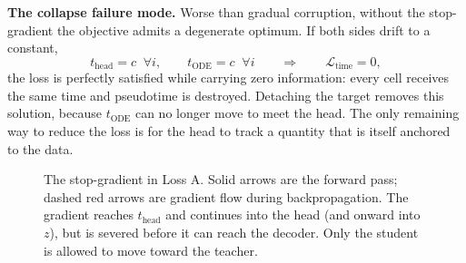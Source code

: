 \documentclass[11pt,a4paper]{article}
\newenvironment{keybox}{\begin{shaded}\noindent}{\end{shaded}}
\newcommand{\ts}{t_{s}}
\theoremstyle{definition}
\begin{document}
\begin{keybox}
\textbf{The collapse failure mode.} Worse than gradual corruption, without the
stop-gradient the objective admits a degenerate optimum. If both sides drift to
a constant,
\[
t_{\text{head}} = c \;\;\forall i, \qquad t_{\text{ODE}} = c \;\;\forall i
\qquad\Longrightarrow\qquad \mathcal{L}_{\text{time}} = 0 ,
\]
the loss is perfectly satisfied while carrying zero information: every cell
receives the same time and pseudotime is destroyed. Detaching the target
removes this solution, because $t_{\text{ODE}}$ can no longer move to meet the
head. The only remaining way to reduce the loss is for the head to track a
quantity that is itself anchored to the data.
\end{keybox}

\begin{figure}[htbp]
\centering
{}
\caption{The stop-gradient in Loss A. Solid arrows are the forward pass; dashed
red arrows are gradient flow during backpropagation. The gradient reaches
$t_{\text{head}}$ and continues into the head (and onward into $z$), but is
severed before it can reach the decoder. Only the student is allowed to move
toward the teacher.}
\label{fig:stopgrad}
\end{figure}
\end{document}
